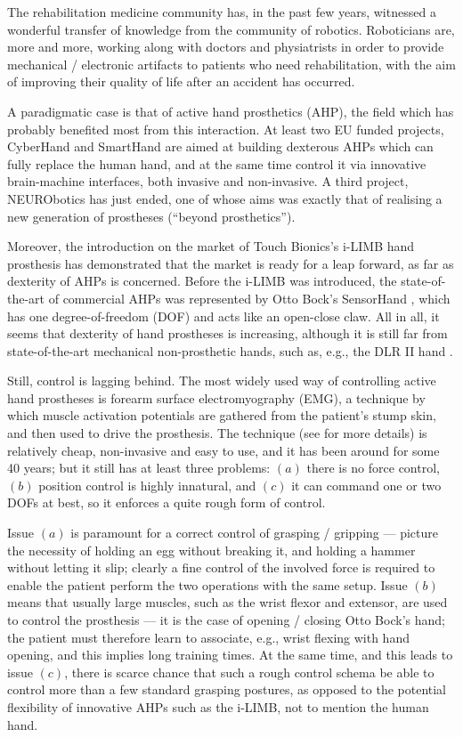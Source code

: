 The rehabilitation medicine community has, in the past few years,
witnessed a wonderful transfer of knowledge from the community of
robotics. Roboticians are, more and more, working along with doctors
and physiatrists in order to provide mechanical / electronic artifacts
to patients who need rehabilitation, with the aim of improving their
quality of life after an accident has occurred.

A paradigmatic case is that of active hand prosthetics (AHP), the
field which has probably benefited most from this interaction. At
least two EU funded projects, CyberHand \cite{cyberhand} and SmartHand
\cite{smarthand} are aimed at building dexterous AHPs which can fully
replace the human hand, and at the same time control it via innovative
brain-machine interfaces, both invasive and non-invasive. A third
project, NEURObotics \cite{neurobotics} has just ended, one of whose
aims was exactly that of realising a new generation of prostheses
(``beyond prosthetics'').

Moreover, the introduction on the market of Touch Bionics's i-LIMB
hand prosthesis \cite{ilimb} has demonstrated that the market is ready
for a leap forward, as far as dexterity of AHPs is concerned. Before
the i-LIMB was introduced, the state-of-the-art of commercial AHPs was
represented by Otto Bock's SensorHand \cite{sensorhand}, which has one
degree-of-freedom (DOF) and acts like an open-close claw. All in all,
it seems that dexterity of hand prostheses is increasing, although it
is still far from state-of-the-art mechanical non-prosthetic hands,
such as, e.g., the DLR II hand \cite{Hua2006}.

Still, control is lagging behind. The most widely used way of
controlling active hand prostheses is forearm surface electromyography
(EMG), a technique by which muscle activation potentials are gathered
from the patient's stump skin, and then used to drive the
prosthesis. The technique (see \cite{deluca} for more details) is
relatively cheap, non-invasive and easy to use, and it has been around
for some 40 years; but it still has at least three problems: $(a)$
there is no force control, $(b)$ position control is highly innatural,
and $(c)$ it can command one or two DOFs at best, so it enforces a
quite rough form of control.

Issue $(a)$ is paramount for a correct control of grasping / gripping
--- picture the necessity of holding an egg without breaking it, and
holding a hammer without letting it slip; clearly a fine control of
the involved force is required to enable the patient perform the two
operations with the same setup. Issue $(b)$ means that usually large
muscles, such as the wrist flexor and extensor, are used to control
the prosthesis --- it is the case of opening / closing Otto Bock's
hand; the patient must therefore learn to associate, e.g., wrist
flexing with hand opening, and this implies long training times. At
the same time, and this leads to issue $(c)$, there is scarce chance
that such a rough control schema be able to control more than a few
standard grasping postures, as opposed to the potential flexibility of
innovative AHPs such as the i-LIMB, not to mention the human hand.

